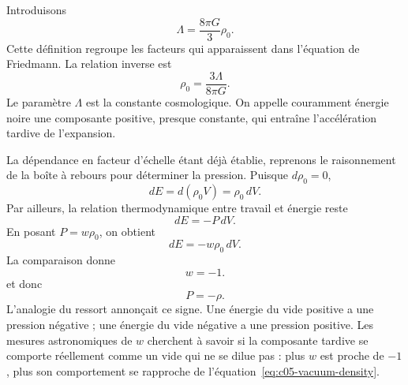Introduisons
\begin{equation}
\Lambda=\frac{8\pi G}{3}\rho_0.
\label{eq:c05-lambda-definition}
\end{equation}
Cette définition regroupe les facteurs qui apparaissent dans l’équation de Friedmann. La relation inverse est
\begin{equation}
\rho_0=\frac{3\Lambda}{8\pi G}.
\end{equation}
Le paramètre \(\Lambda\) est la constante cosmologique. On appelle couramment énergie noire une composante positive, presque constante, qui entraîne l’accélération tardive de l’expansion.

La dépendance en facteur d’échelle étant déjà établie, reprenons le raisonnement de la boîte à rebours pour déterminer la pression. Puisque \(d\rho_0=0\),
\begin{equation}
dE=d(\rho_0V)=\rho_0\,dV.
\end{equation}
Par ailleurs, la relation thermodynamique entre travail et énergie reste
\begin{equation}
dE=-P\,dV.
\end{equation}
En posant \(P=w\rho_0\), on obtient
\begin{equation}
dE=-w\rho_0\,dV.
\end{equation}
La comparaison donne
\begin{equation}
w=-1.
\end{equation}
et donc
\begin{equation}
P=-\rho.
\end{equation}
L’analogie du ressort annonçait ce signe. Une énergie du vide positive a une pression négative ; une énergie du vide négative a une pression positive. Les mesures astronomiques de \(w\) cherchent à savoir si la composante tardive se comporte réellement comme un vide qui ne se dilue pas : plus \(w\) est proche de \(-1\), plus son comportement se rapproche de l’équation~\eqref{eq:c05-vacuum-density}.

\begin{classroomqa}
\end{classroomqa}

